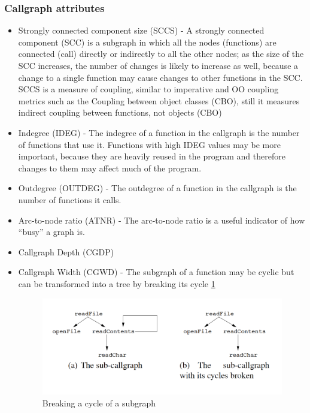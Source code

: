 \documentclass{article}
\begin{document}
\subsubsection{Callgraph attributes}
\begin{itemize}
\item Strongly connected component size (SCCS) - A strongly connected component (SCC) is a subgraph in which all the nodes (functions) are connected (call) directly or indirectly to all the other nodes; as the size of the SCC increases, the number of changes is likely to increase as well, because a change to a single function may cause changes to other functions in the SCC. SCCS is a measure of coupling, similar to imperative and OO coupling metrics such as the Coupling between object classes (CBO), still it measures indirect coupling between functions, not objects (CBO)
\item Indegree (IDEG) - The indegree of a function in the callgraph is the number of functions that use it. Functions with high IDEG values may be more important, because they are heavily reused in the program and therefore changes to them may affect much of the program.
\item Outdegree (OUTDEG) - The outdegree of a function in the callgraph is the number of functions it calls.
\item Arc-to-node ratio (ATNR) - The arc-to-node ratio is a useful indicator of how “busy” a graph is.
\item Callgraph Depth (CGDP)
\item Callgraph Width (CGWD) - The subgraph of a function may be cyclic but can be transformed into a tree by breaking its cycle \ref{fig:subgraph-brake}
\begin{figure}[h!]
  \includegraphics[width=\linewidth]{subgraph-brake.png}
  \caption{Breaking a cycle of a subgraph  \cite{eps250597}}
  \label{fig:subgraph-brake}
\end{figure}

\end{itemize}
\end{document}
